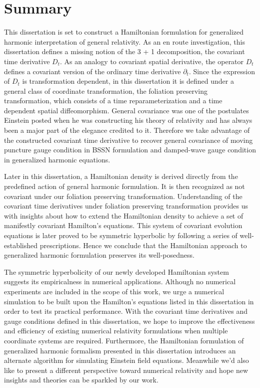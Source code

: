 \chapter{Summary}\label{summary}
This dissertation is set to construct a Hamiltonian formulation for generalized harmonic interpretation of general relativity. As an en route investigation, this dissertation defines a missing notion of the 3 + 1 decomposition, the covariant time derivative $D_{t}$. As an analogy to covariant spatial derivative, the operator $D_{t}$ defines a covariant version of the ordinary time derivative $\partial_{t}$. Since the expression of $D_{t}$ is transformation dependent, in this dissertation it is defined under a general class of coordinate transformation, the foliation preserving transformation, which consists of a time reparameterization and a time dependent spatial diffeomorphism. General covariance was one of the postulates Einstein posted when he was constructing his theory of relativity and has always been a major part of the elegance credited to it. Therefore we take advantage of the constructed covariant time derivative to recover general covariance of moving puncture gauge condition in BSSN formulation and damped-wave gauge condition in generalized harmonic equations. 

Later in this dissertation, a Hamiltonian density is derived directly from the predefined action of general harmonic formulation. It is then recognized as not covariant under our foliation preserving transformation. Understanding of the covariant time derivatives under foliation preserving transformation provides us with insights about how to extend the Hamiltonian density to achieve a set of manifestly covariant Hamilton's equations. This system of covariant evolution equations is later proved to be symmetric hyperbolic by following a series of well-established prescriptions. Hence we conclude that the Hamiltonian approach to generalized harmonic formulation preserves its well-posedness. 

The symmetric hyperbolicity of our newly developed Hamiltonian system suggests its empiricalness in numerical applications. Although no numerical experiments are included in the scope of this work, we urge a numerical simulation to be built upon the Hamilton's equations listed in this dissertation in order to test its practical performance. With the covariant time derivatives and gauge conditions defined in this dissertation, we hope to improve the effectiveness and efficiency of existing numerical relativity formulations when multiple coordinate systems are required. Furthermore, the Hamiltonian formulation of generalized harmonic formalism presented in this dissertation introduces an alternate algorithm for simulating Einstein field equations. Meanwhile we'd also like to present a different perspective toward numerical relativity and hope new insights and theories can be sparkled by our work. 